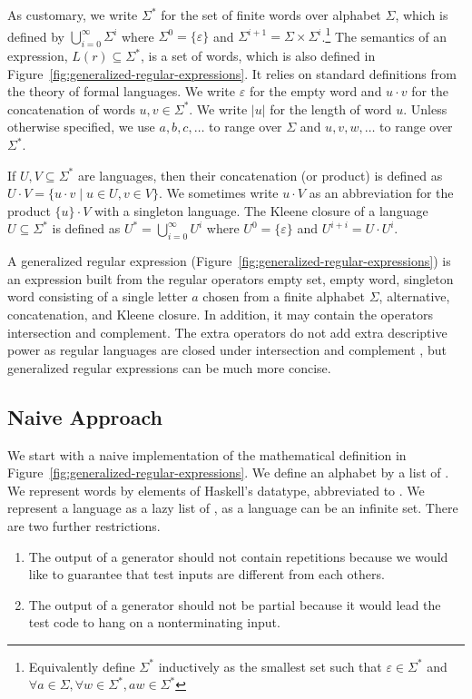 As customary, we write $\Sigma^*$ for the set of finite words over
alphabet $\Sigma$, which is defined by $\bigcup_{i=0}^\infty \Sigma^i$
where $\Sigma^0 = \{\varepsilon\}$ and $\Sigma^{i+1} = \Sigma \times
\Sigma^i$.\footnote{Equivalently define $\Sigma^*$
inductively as the smallest set such that $\varepsilon \in
\Sigma^*$ and $\forall a\in\Sigma, \forall w\in\Sigma^*, aw \in \Sigma^*$}
The semantics of an expression, $L(r) \subseteq \Sigma^*$, is a set of
words, which is also defined in
Figure~\ref{fig:generalized-regular-expressions}. It relies on
standard definitions from the theory of formal languages. We write
$\varepsilon$ for the empty word and $u\cdot v$ for the concatenation
of words $u, v \in \Sigma^*$. We write $|u|$ for the length of word
$u$. Unless otherwise specified, we use $a, b, c, \dots$ to range over
$\Sigma$ and $u, v, w, \dots$ to range over $\Sigma^*$.

If $U, V \subseteq \Sigma^*$ are
languages, then their concatenation (or product) is defined as $U\cdot
V = \{ u\cdot v \mid u\in U, v\in V\}$. We sometimes write $u\cdot V$
as an abbreviation for the product $\{u\}\cdot V$ with a singleton
language. The Kleene closure of a
language $U\subseteq \Sigma^*$ is defined as $U^* =
\bigcup_{i=0}^\infty U^i$ where $U^0 = \{\varepsilon\}$ and $U^{i+i} =
U \cdot U^i$. 

A generalized regular expression
(Figure~\ref{fig:generalized-regular-expressions}) is an expression
built from the regular operators empty set, empty word, singleton word
consisting of a single letter $a$ chosen from a finite alphabet
$\Sigma$, alternative, concatenation, and Kleene closure. In addition, it
may contain the operators intersection and complement. The extra
operators do not add extra descriptive power as regular languages are
closed under intersection and complement \cite{DBLP:books/daglib/0011126}, but
generalized regular expressions can be much more concise. 



\subsection{Naive Approach}
\label{sec:naive-approach}

We start with a naive implementation of the mathematical definition in
Figure~\ref{fig:generalized-regular-expressions}. We define an
alphabet by a list of .  We represent words by elements of Haskell's
 datatype, abbreviated to . We
represent a language as a lazy list of , as a language
can be an infinite set. There are two further restrictions.
\begin{enumerate}
\item The output of a generator should not contain repetitions
  because we would like to guarantee that test inputs are different
  from each others.
\item The output of a generator should not be partial because it would
  lead the test code to hang on a nonterminating input.
\end{enumerate}

